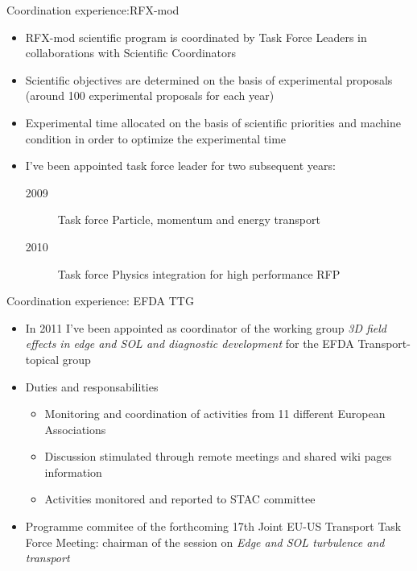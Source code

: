 \documentclass[t,10pt]{beamer}
\begin{document}
\begin{frame}{Coordination experience:RFX-mod}
\begin{itemize}[<+->]
\item RFX-mod scientific program is coordinated by Task Force Leaders in collaborations with
  Scientific Coordinators
\item Scientific objectives are determined on the basis of
  experimental proposals (around 100 experimental proposals for each year)
\item Experimental time allocated on the basis of scientific
  priorities and machine condition in order to optimize the
  experimental time
\item I've been appointed task force leader for two subsequent years:
  \begin{description}
  \item[2009] Task force \alert{Particle, momentum and energy transport}
  \item[2010] Task force \alert{Physics integration for high
      performance RFP}
  \end{description}
\end{itemize} 
\end{frame}


\begin{frame}{Coordination experience: EFDA TTG}
  \begin{itemize}
\item In 2011 I've been appointed as coordinator of the working group
  \emph{3D field effects in edge and SOL and diagnostic development}
  for the EFDA Transport-topical group
\item Duties and responsabilities
  \begin{itemize}
\item Monitoring and coordination of activities from 11 different European Associations
\item Discussion stimulated through remote meetings and shared wiki
  pages information
\item Activities monitored and reported to STAC committee 
  \end{itemize}
\item Programme commitee of the forthcoming 17th Joint EU-US Transport
  Task Force Meeting: chairman of the session on \emph{Edge and SOL
  turbulence and transport}
\end{itemize} 
\end{frame}
\end{document}
